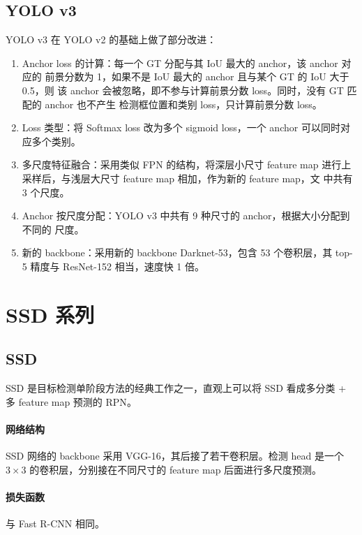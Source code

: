 \subsection{YOLO v3}
\label{subsec:YOLOv3}
YOLO v3 在 YOLO v2 的基础上做了部分改进：

\begin{enumerate}
  \item Anchor loss 的计算：每一个 GT 分配与其 IoU 最大的 anchor，该 anchor 对应的
    前景分数为 1，如果不是 IoU 最大的 anchor 且与某个 GT 的 IoU 大于 0.5，则
    该 anchor 会被忽略，即不参与计算前景分数 loss。同时，没有 GT 匹配的 anchor 也不产生
    检测框位置和类别 loss，只计算前景分数 loss。
  \item Loss 类型：将 Softmax loss 改为多个 sigmoid loss，一个 anchor 可以同时对
    应多个类别。
  \item 多尺度特征融合：采用类似 FPN\cite{2016-FPN} 的结构，将深层小尺寸 feature
    map 进行上采样后，与浅层大尺寸 feature map 相加，作为新的 feature map，文
    中共有 3 个尺度。
  \item Anchor 按尺度分配：YOLO v3 中共有 9 种尺寸的 anchor，根据大小分配到不同的
    尺度。
  \item 新的 backbone：采用新的 backbone Darknet-53，包含 53 个卷积层，其 top-5
    精度与 ResNet-152 相当，速度快 1 倍。
\end{enumerate}

\section{SSD 系列}
\label{sec:SSD}

\subsection{SSD}
\label{subsec:SSD}

SSD 是目标检测单阶段方法的经典工作之一，直观上可以将 SSD 看成多分类 + 多 feature
map 预测的 RPN\cite{2015-SSD}。

\paragraph{网络结构}
SSD 网络的 backbone 采用 VGG-16，其后接了若干卷积层。检测 head 是一个 $3 \times
3$ 的卷积层，分别接在不同尺寸的 feature map 后面进行多尺度预测。

\paragraph{损失函数}
与 Fast R-CNN 相同。

